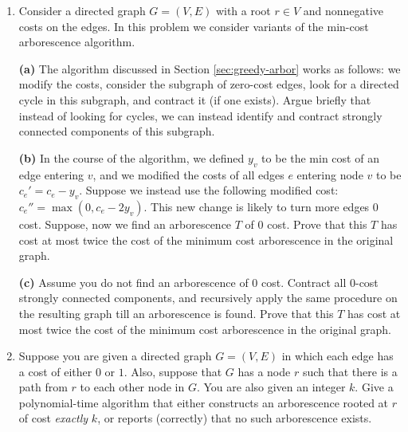 \documentclass[12pt]{article}
\begin{document}
\begin{enumerate}
\item 

Consider a directed graph $G=(V,E)$ with a root $r \in V$ and
nonnegative costs on the edges. In this problem we consider variants of the
min-cost arborescence algorithm.

{\bf (a)} The algorithm discussed in Section \ref{sec:greedy-arbor}
works as follows: we modify the costs, 
consider the subgraph of zero-cost edges, look for a directed cycle in this
subgraph, and contract it (if one exists). Argue briefly that instead of
looking for cycles, we can instead identify and contract strongly connected
components of this subgraph.

{\bf (b)} In the course of the algorithm,
we defined $y_v$ to be the min cost of an edge entering $v$,
and we modified the costs of all edges $e$ 
entering node $v$ to be $c_e'=c_e-y_v$.
Suppose we instead use the following modified cost: $c_e''=\max(0,c_e-2y_v)$.
This new change is likely to turn more edges 0 cost. Suppose, now we find
an arborescence $T$ of  0 cost. Prove that this $T$ has cost at most twice
the cost of the minimum cost arborescence in the original graph.

{\bf (c)\Star} Assume you do not
find an arborescence of 0 cost. Contract all 0-cost strongly connected
components, and recursively apply the same procedure on the resulting graph
till an arborescence is found.  Prove that this $T$ has cost at most twice
the cost of the minimum cost arborescence in the original graph.


\item\Star
Suppose you are given a directed graph $G = (V,E)$
in which each edge has a cost of either $0$ or $1$.
Also, suppose that $G$ has a node $r$ such that
there is a path from $r$ to each other node in $G$.
You are also given an integer $k$.
Give a polynomial-time algorithm that
either constructs an arborescence rooted at $r$ of cost {\em exactly} $k$,
or reports (correctly) that no such arborescence exists.

\end{enumerate}
\end{document}

